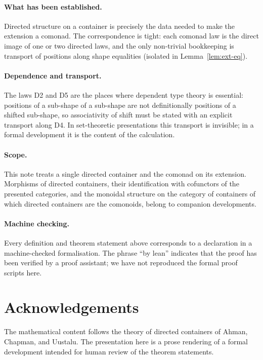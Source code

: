 \documentclass[11pt,a4paper]{article}
\theoremstyle{plain}
\theoremstyle{definition}
\begin{document}
\paragraph{What has been established.}
Directed structure on a container is precisely the data needed to make the
extension a comonad. The correspondence is tight: each comonad law is the
direct image of one or two directed laws, and the only non-trivial
bookkeeping is transport of positions along shape equalities (isolated in
Lemma~\ref{lem:ext-eq}).

\paragraph{Dependence and transport.}
The laws D2 and D5 are the places where dependent type theory is essential:
positions of a sub-shape of a sub-shape are not definitionally positions of a
shifted sub-shape, so associativity of shift must be stated with an explicit
transport along D4. In set-theoretic presentations this transport is
invisible; in a formal development it is the content of the calculation.

\paragraph{Scope.}
This note treats a single directed container and the comonad on its
extension. Morphisms of directed containers, their identification with
cofunctors of the presented categories, and the monoidal structure on the
category of containers of which directed containers are the comonoids, belong
to companion developments.

\paragraph{Machine checking.}
Every definition and theorem statement above corresponds to a declaration in a
machine-checked formalisation. The phrase ``by lean'' indicates that the proof
has been verified by a proof assistant; we have not reproduced the formal
proof scripts here.

\section*{Acknowledgements}

The mathematical content follows the theory of directed containers of Ahman,
Chapman, and Uustalu. The presentation here is a prose rendering of a formal
development intended for human review of the theorem statements.
\end{document}
